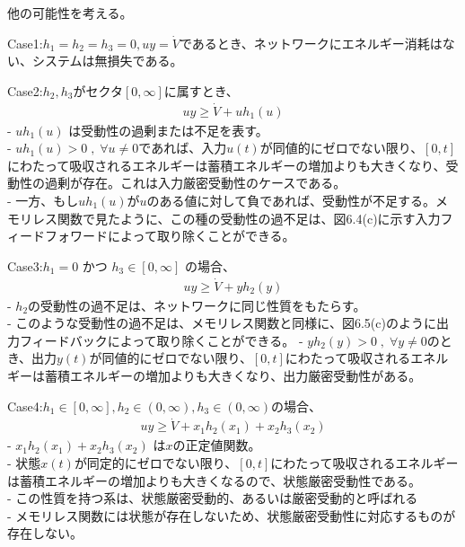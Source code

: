 \documentclass{jsarticle}
\begin{document}
他の可能性を考える。

Case1:$h_1=h_2=h_3 = 0,uy = \dot V$であるとき、ネットワークにエネルギー消耗はない、システムは無損失である。

Case2:$h_2,h_3$がセクタ$[0,\infty]$に属すとき、
\begin{align}
  uy \geq \dot V + u h_1(u)
\end{align}
- $uh_1 (u)$ は受動性の過剰または不足を表す。\\
- $uh_1 (u) > 0\;,\;\forall u \neq0$であれば、入力$u(t)$が同値的にゼロでない限り、$[0, t]$にわたって吸収されるエネルギーは蓄積エネルギーの増加よりも大きくなり、受動性の過剰が存在。これは入力厳密受動性のケースである。\\
- 一方、もし$uh_1 (u)$が$u$のある値に対して負であれば、受動性が不足する。メモリレス関数で見たように、この種の受動性の過不足は、図6.4(c)に示す入力フィードフォワードによって取り除くことができる。

Case3:$h_1 = 0$ かつ $h_3 \in  [0, \infty]$ の場合、 
\begin{align}
  uy \geq \dot V +  yh_2(y)
\end{align}
- $h_2$の受動性の過不足は、ネットワークに同じ性質をもたらす。\\
- このような受動性の過不足は、メモリレス関数と同様に、図6.5(c)のように出力フィードバックによって取り除くことができる。
- $yh_2(y) > 0\;,\;\forall y\neq 0$のとき、出力$y(t)$が同値的にゼロでない限り、$[0, t]$にわたって吸収されるエネルギーは蓄積エネルギーの増加よりも大きくなり、出力厳密受動性がある。

Case4:$h_1 \in [0, \infty],h_2 \in (0,\infty),h_3 \in  (0,\infty)$の場合、 
\begin{align}
  uy \geq \dot V + x_1 h_2(x_1)+x_2h_3(x_2)
\end{align}
- $x_1 h_2(x_1)+x_2h_3(x_2)$ は$x$の正定値関数。\\
- 状態$x(t)$が同定的にゼロでない限り、$[0, t]$にわたって吸収されるエネルギーは蓄積エネルギーの増加よりも大きくなるので、状態厳密受動性である。\\
- この性質を持つ系は、状態厳密受動的、あるいは厳密受動的と呼ばれる\\
- メモリレス関数には状態が存在しないため、状態厳密受動性に対応するものが存在しない。
\end{document}

